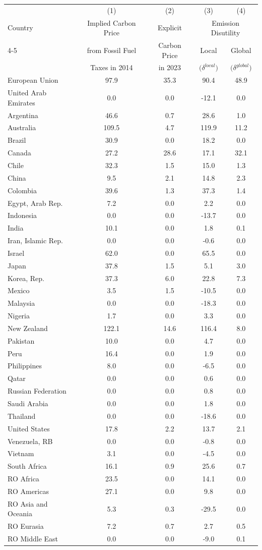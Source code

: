 \begin{tabular}{l c c cc}
\toprule
        & (1)         & (2)          & (3) & (4) \\
\addlinespace[3pt]
Country & Implied Carbon Price  & Explicit        & \multicolumn{2}{c}{Emission Disutility} \\
\cline{4-5}
\addlinespace[2pt]
        &  from Fossil Fuel            & Carbon Price    & Local & Global \\
        &   Taxes in 2014          & in 2023         & $\Big( \delta^{local} \Big)$ & $ \Big( \delta^{global} \Big)$ \\
\midrule
European Union & 97.9 & 35.3 & 90.4 & 48.9 \\United Arab Emirates & 0.0 & 0.0 & -12.1 & 0.0 \\Argentina & 46.6 & 0.7 & 28.6 & 1.0 \\Australia & 109.5 & 4.7 & 119.9 & 11.2 \\Brazil & 30.9 & 0.0 & 18.2 & 0.0 \\Canada & 27.2 & 28.6 & 17.1 & 32.1 \\Chile & 32.3 & 1.5 & 15.0 & 1.3 \\China & 9.5 & 2.1 & 14.8 & 2.3 \\Colombia & 39.6 & 1.3 & 37.3 & 1.4 \\Egypt, Arab Rep. & 7.2 & 0.0 & 2.2 & 0.0 \\Indonesia & 0.0 & 0.0 & -13.7 & 0.0 \\India & 10.1 & 0.0 & 1.8 & 0.1 \\Iran, Islamic Rep. & 0.0 & 0.0 & -0.6 & 0.0 \\Israel & 62.0 & 0.0 & 65.5 & 0.0 \\Japan & 37.8 & 1.5 & 5.1 & 3.0 \\Korea, Rep. & 37.3 & 6.0 & 22.8 & 7.3 \\Mexico & 3.5 & 1.5 & -10.5 & 0.0 \\Malaysia & 0.0 & 0.0 & -18.3 & 0.0 \\Nigeria & 1.7 & 0.0 & 3.3 & 0.0 \\New Zealand & 122.1 & 14.6 & 116.4 & 8.0 \\Pakistan & 10.0 & 0.0 & 4.7 & 0.0 \\Peru & 16.4 & 0.0 & 1.9 & 0.0 \\Philippines & 8.0 & 0.0 & -6.5 & 0.0 \\Qatar & 0.0 & 0.0 & 0.6 & 0.0 \\Russian Federation & 0.0 & 0.0 & 0.8 & 0.0 \\Saudi Arabia & 0.0 & 0.0 & 1.8 & 0.0 \\Thailand & 0.0 & 0.0 & -18.6 & 0.0 \\United States & 17.8 & 2.2 & 13.7 & 2.1 \\Venezuela, RB & 0.0 & 0.0 & -0.8 & 0.0 \\Vietnam & 3.1 & 0.0 & -4.5 & 0.0 \\South Africa & 16.1 & 0.9 & 25.6 & 0.7 \\RO Africa & 23.5 & 0.0 & 14.1 & 0.0 \\RO Americas & 27.1 & 0.0 & 9.8 & 0.0 \\RO Asia and Oceania & 5.3 & 0.3 & -29.5 & 0.0 \\RO Eurasia & 7.2 & 0.7 & 2.7 & 0.5 \\RO Middle East & 0.0 & 0.0 & -9.0 & 0.1 \\ \bottomrule
\end{tabular}
